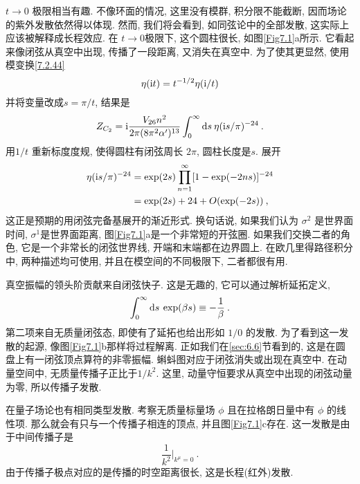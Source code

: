 $t \rightarrow 0$ 极限相当有趣. 不像环面的情况, 这里没有模群, 积分限不能截断, 因而场论的紫外发散依然得以体现. 然而, 我们将会看到, 如同弦论中的全部发散, 这实际上应该被解释成长程效应. 在 $t \rightarrow 0$极限下, 这个圆柱很长, 如图\ref{Fig7.1}a所示. 它看起来像闭弦从真空中出现, 传播了一段距离, 又消失在真空中. 
为了使其更显然, 使用模变换\eqref{7.2.44}
\begin{equation}
	\eta(\mathrm{i} t)=t^{-1 / 2} \eta(\mathrm{i} / t) \label{7.4.2}
\end{equation}
并将变量改成$s=\pi / t$, 结果是
\begin{equation}
	Z_{C_{2}}=\mathrm{i} \frac{V_{26} n^{2}}{2 \pi(8 \pi^{2} \alpha^{\prime})^{13}} \int_{0}^{\infty} \mathrm{d} s\: \eta(\mathrm{i} s / \pi)^{-24} \:. \label{7.4.3}
\end{equation}
用$1 / t$ 重新标度度规, 使得圆柱有闭弦周长 $2 \pi$, 圆柱长度是$s$. 展开
\begin{align}
	\eta(\mathrm{i} s / \pi)^{-24} &=\exp (2 s) \prod_{n=1}^{\infty}[1-\exp (-2 n s)]^{-24} \nonumber \\
	&=\exp (2 s)+24+O(\exp (-2 s)) \:, \label{7.4.4}
\end{align}
这正是预期的用闭弦完备基展开的渐近形式. 换句话说, 如果我们认为 $\sigma^{2}$ 是世界面时间, $\sigma^{1}$是世界面距离, 图\ref{Fig7.1}a是一个非常短的开弦圈. 
如果我们交换二者的角色, 它是一个非常长的闭弦世界线, 开端和末端都在边界圆上. 在欧几里得路径积分中, 两种描述均可使用, 并且在模空间的不同极限下, 二者都很有用.

真空振幅的领头阶贡献来自闭弦快子. 这是无趣的, 它可以通过解析延拓定义,
\begin{equation}
	\int_{0}^{\infty} \mathrm{d} s\:  \exp (\beta s) \equiv-\frac{1}{\beta} \:. \label{7.4.5}
\end{equation}
第二项来自无质量闭弦态, 即使有了延拓也给出形如 $1 / 0$ 的发散. 为了看到这一发散的起源, 像图\ref{Fig7.1}b那样将过程解离. 
正如我们在\ref{sec:6.6}节看到的, 这是在圆盘上有一闭弦顶点算符的非零振幅. 蝌蚪图对应于闭弦消失或出现在真空中. 在动量空间中, 无质量传播子正比于$1 / k^{2}$. 
这里, 动量守恒要求从真空中出现的闭弦动量为零, 所以传播子发散.

在量子场论也有相同类型发散. 考察无质量标量场 $\phi$ 且在拉格朗日量中有 $\phi$ 的线性项. 那么就会有只与一个传播子相连的顶点, 并且图\ref{Fig7.1}c存在. 
这一发散是由于中间传播子是
\begin{equation}
	\frac{1}{k^{2}}\bigg|_{k^{\mu}=0} \:. \label{7.4.6}
\end{equation}
由于传播子极点对应的是传播的时空距离很长, 这是长程(红外)发散.

